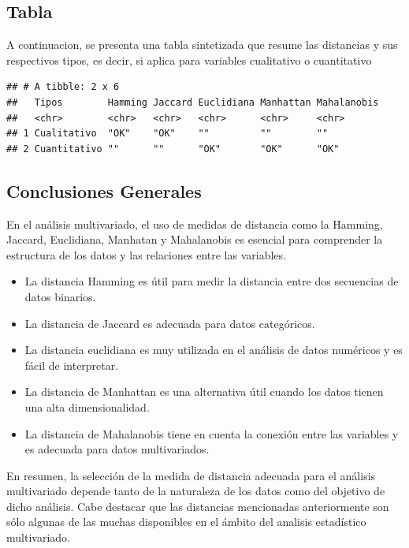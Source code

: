 \documentclass[
]{article}
\begin{document}
\hypertarget{tabla}{%
\subsection{Tabla}\label{tabla}}

A continuacion, se presenta una tabla sintetizada que resume las
distancias y sus respectivos tipos, es decir, si aplica para variables
cualitativo o cuantitativo

\begin{verbatim}
## # A tibble: 2 x 6
##   Tipos        Hamming Jaccard Euclidiana Manhattan Mahalanobis
##   <chr>        <chr>   <chr>   <chr>      <chr>     <chr>      
## 1 Cualitativo  "OK"    "OK"    ""         ""        ""         
## 2 Cuantitativo ""      ""      "OK"       "OK"      "OK"
\end{verbatim}

\hypertarget{conclusiones-generales}{%
\subsection{Conclusiones Generales}\label{conclusiones-generales}}

En el análisis multivariado, el uso de medidas de distancia como la
Hamming, Jaccard, Euclidiana, Manhatan y Mahalanobis es esencial para
comprender la estructura de los datos y las relaciones entre las
variables.

\begin{itemize}
\item
  La distancia Hamming es útil para medir la distancia entre dos
  secuencias de datos binarios.
\item
  La distancia de Jaccard es adecuada para datos categóricos.
\item
  La distancia euclidiana es muy utilizada en el análisis de datos
  numéricos y es fácil de interpretar.
\item
  La distancia de Manhattan es una alternativa útil cuando los datos
  tienen una alta dimensionalidad.
\item
  La distancia de Mahalanobis tiene en cuenta la conexión entre las
  variables y es adecuada para datos multivariados.
\end{itemize}

En resumen, la selección de la medida de distancia adecuada para el
análisis multivariado depende tanto de la naturaleza de los datos como
del objetivo de dicho análisis. Cabe destacar que las distancias
mencionadas anteriormente son sólo algunas de las muchas disponibles en
el ámbito del analisis estadístico multivariado.
\end{document}
